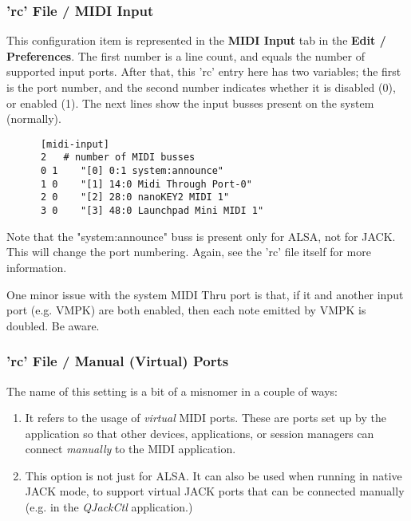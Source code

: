 \subsubsection{'rc' File / MIDI Input}
\label{subsubsec:configuration_rc_midi_input}

   This configuration item is represented in the
   \textbf{MIDI Input} tab in the \textbf{Edit / Preferences}.
   The first number is a line count, and equals the number of
   supported input ports.
   After that, this 'rc' entry here has two variables;
   the first is the port number,
   and the second number indicates whether it is disabled (0), or enabled (1).
   The next lines show the input busses present on the system (normally).

   \begin{verbatim}
      [midi-input]
      2   # number of MIDI busses
      0 1    "[0] 0:1 system:announce"
      1 0    "[1] 14:0 Midi Through Port-0"
      2 0    "[2] 28:0 nanoKEY2 MIDI 1"
      3 0    "[3] 48:0 Launchpad Mini MIDI 1"
   \end{verbatim}

   Note that the "system:announce" buss is present only for ALSA, not for JACK.
   This will change the port numbering.
   Again, see the 'rc' file itself for more information.

   One minor issue with the system MIDI Thru port is that, if it and another
   input port (e.g. VMPK) are both enabled, then each note emitted by VMPK is
   doubled. Be aware.

\subsubsection{'rc' File / Manual (Virtual) Ports}
\label{subsubsec:configuration_rc_manual_ports}

   The name of this setting is a bit of a misnomer in a couple of ways:

   \begin{enumerate}
      \item It refers to the usage of \textsl{virtual} MIDI ports.
         These are ports set up by the application so that other
         devices, applications, or session managers can connect
         \textsl{manually} to the MIDI application.
      \item This option is not just for ALSA.  It can also be used when
         running in native JACK mode, to support
         virtual JACK ports that can be connected manually (e.g. in the
         \textsl{QJackCtl} application.)
   \end{enumerate}

